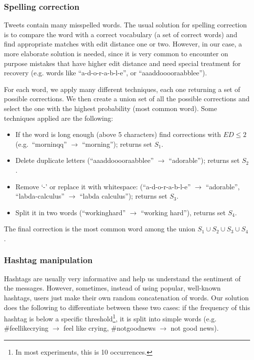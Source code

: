 \documentclass[10pt,conference,compsocconf]{IEEEtran}
\begin{document}
\subsubsection{Spelling correction}
Tweets contain many misspelled words. The usual solution for spelling correction is to  compare the word with a correct vocabulary (a set of correct words)\footnotemark{} and find appropriate matches with edit distance one or two. However, in our case, a more elaborate solution is needed, since it is very common to encounter on purpose mistakes that have higher edit distance and need special treatment for recovery (e.g. words like
``a-d-o-r-a-b-l-e'', or ``aaaddooooraabblee'').

For each word, we apply many different techniques, each one returning a set of possible corrections. We then create a union set of all the possible corrections and select the one with the highest probability (most common word).
Some techniques applied are the following:

\begin{itemize}
\item If the word is long enough (above 5 characters) find corrections with $ED \leq 2$ 
(e.g.\ ``morninqq'' $\to$ ``morning''); returns set $S_1$.
\item Delete duplicate letters (``aaaddooooraabblee'' $\to$ ``adorable''); returns set $S_2$.
\item Remove `-' or replace it with whitespace:
(``a-d-o-r-a-b-l-e'' $\to$ ``adorable'', ``labda-calculus'' $\to$ ``labda calculus'');
returns set $S_3$.
\item Split it in two words (``workinghard'' $\to$ ``working hard''), returns set $S_4$.
\end{itemize}

The final correction is the most common word among the union $S_1 \cup S_2 \cup S_3 \cup S_4$. 
\subsubsection{Hashtag manipulation}
Hashtags are usually very informative and help us understand the sentiment of the messages. However, sometimes, instead of using popular, well-known hashtags, users just make their own random concatenation of words.
Our solution does the following to differentiate between these two cases: if the frequency of this hashtag is below a specific threshold\footnote{In most experiments, this is 10 occurrences.}, it is split into simple words (e.g. \#feellikecrying $\to$ feel like crying, \#notgoodnews $\to$ not good news).
\end{document}

